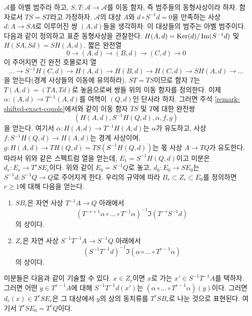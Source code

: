 \begin{remark}[변형]
\label{remark-differential-object-selfmap}
$\mathcal{A}$를 아벨 범주라 하고,
$S, T : \mathcal{A} \to \mathcal{A}$를 이동 함자, 즉 범주들의
동형사상이라 하자. 함자로서 $TS = ST$라고 가정하자.
$\mathcal{A}$의 대상 $A$와 $d \circ S^{-1}d = 0$을 만족하는 사상
$d : A \to SA$로 이루어진 쌍 $(A, d)$들을 생각하자. 이 대상들의
범주는 아벨 범주이다. 다음과 같이 정의하고 표준 동형사상을 관찰한다.
$H(A, d) = \mathop{\mathrm{Ker}}(d)/\mathop{\mathrm{Im}}(S^{-1}d)$ 및 $H(SA, Sd) = SH(A, d)$.
짧은 완전열
$$
0 \to (A, d) \to (B, d) \to (C, d) \to 0
$$
이 주어지면 긴 완전 호몰로지 열
$$
\ldots \to S^{-1}H(C, d) \to
H(A, d) \to H(B, d) \to H(C, d) \to SH(A, d) \to \ldots
$$
을 얻는다(경계 사상들의 이동에 유의하라). $ST = TS$이므로 함자 $T$는
$T(A, d) = (TA, Td)$로 놓음으로써 쌍들 위의 이동 함자를 정의한다.
이제 $\alpha : (A, d) \to T^{-1}(A, d)$를 여핵이 $(Q, d)$인 단사라
하자. 그러면 주석 \ref{remark-shifted-exact-couple}에서와 같이 이동
함자 $TS$ 및 $T$에 대한 완전쌍
$$
(H(A, d), S^{-1}H(Q, d), \overline{\alpha}, f, g)
$$
을 얻는다. 여기서 $\overline{\alpha} : H(A, d) \to T^{-1}H(A, d)$는
$\alpha$가 유도하고, 사상 $f : S^{-1}H(Q, d) \to H(A, d)$는 경계
사상이며, $g : H(A, d) \to TH(Q, d) = TS(S^{-1}H(Q, d))$는 몫 사상
$A \to TQ$가 유도한다. 따라서 위와 같은 스펙트럼 열을 얻는데,
$E_1 = S^{-1}H(Q, d)$이고 미분은 $d_r : E_r \to T^rSE_r$이다.
위와 같이 $E_0 = S^{-1}Q$로 놓고, $d_0 : E_0 \to SE_0$는
$S^{-1}d : S^{-1}Q \to Q$로 주어지게 한다. 우리의 규약에 따라
$B_r \subset Z_r \subset E_0$를 정의하면 $r \geq 1$에 대해 다음을
얻는다.
\begin{enumerate}
\item $SB_r$은 자연 사상 $T^{-1}A \to Q$ 아래에서
$$
(T^{-r + 1}\alpha \circ \ldots \circ T^{-1}\alpha)^{-1}
\Im(T^{-r}S^{-1}d)
$$
의 상이다.
\item $Z_r$은 자연 사상 $S^{-1}T^{-1}A \to S^{-1}Q$ 아래에서
$$
(S^{-1}T^{-1}d)^{-1}
\Im(\alpha \circ \ldots \circ T^{r - 1}\alpha)
$$
의 상이다.
\end{enumerate}
미분들은 다음과 같이 기술할 수 있다. $x \in Z_r$이면 $x$로 가는
$x' \in S^{-1}T^{-1}A$를 택하자. 그러면 어떤
$y \in T^{r - 1}A$에 대해 $S^{-1}T^{-1}d(x')$는
$(\alpha \circ \ldots \circ T^{r - 1}\alpha)(y)$이다.
그러면 $d_r(x) \in T^rSE_r$은 그 대상에서 $y$의 상의 동치류를
$T^rSB_r$로 나눈 것으로 표현된다. 여기서 $T^rSE_0 = T^rQ$이다.
\end{remark}













